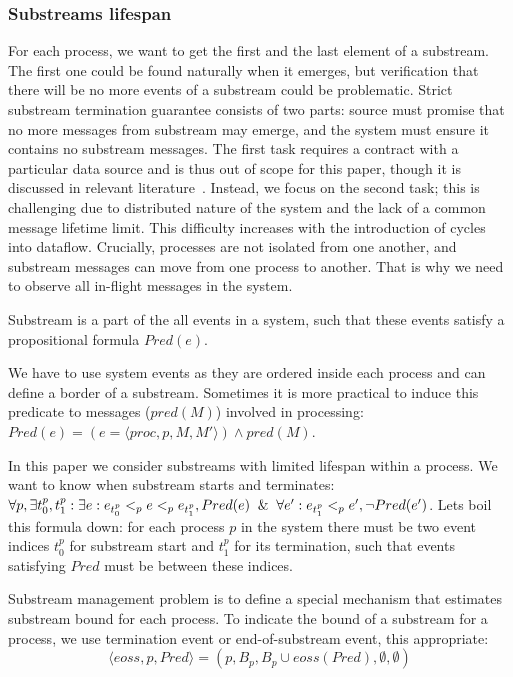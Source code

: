 \subsubsection{Substreams lifespan}

For each process, we want to get the first and the last element of a substream. The first one could be found naturally when it emerges, but verification that there will be no more events of a substream could be problematic. Strict substream termination guarantee consists of two parts: source must promise that no more messages from substream may emerge, and the system must ensure it contains no substream messages. The first task requires a contract with a particular data source and is thus out of scope for this paper, though it is discussed in relevant literature~\cite{awad2019adaptive}. Instead, we focus on the second task; this is challenging due to distributed nature of the system and the lack of a common message lifetime limit. This difficulty increases with the introduction of cycles into dataflow. Crucially, processes are not isolated from one another, and substream messages can move from one process to another. That is why we need to observe all in-flight messages in the system.

\begin{definition}[Substream]
Substream is a part of the all events in a system, such that these events satisfy a propositional formula $Pred(e)$.
\end{definition}

We have to use system events as they are ordered inside each process and can define a border of a substream. Sometimes it is more practical to induce this predicate to messages ($pred(M)$) involved in processing: $Pred(e) = (e = \langle proc, p, M, M'\rangle) \wedge pred(M)$.

In this paper we consider substreams with limited lifespan within a process. We want to know when substream starts and terminates: $\forall p, \exists t_0^p, t_1^p: \exists e: e_{t_0^p} <_p e <_p e_{t_1^p}, Pred(e) \And \forall e': e_{t_1^p} <_p e', \neg Pred(e')$. Lets boil this formula down: for each process $p$ in the system there must be two event indices $t_0^p$ for substream start and $t_1^p$ for its termination, such that events satisfying $Pred$ must be between these indices. 

\begin{definition}
Substream management problem is to define a special mechanism that estimates substream bound for each process. To indicate the bound of a substream for a process, we use termination event or end-of-substream event, this appropriate:
\begin{equation}
  \langle eoss, p, Pred \rangle = (p, B_p, B_p\cup eoss(Pred), \emptyset, \emptyset)  
\end{equation}
\end{definition}

